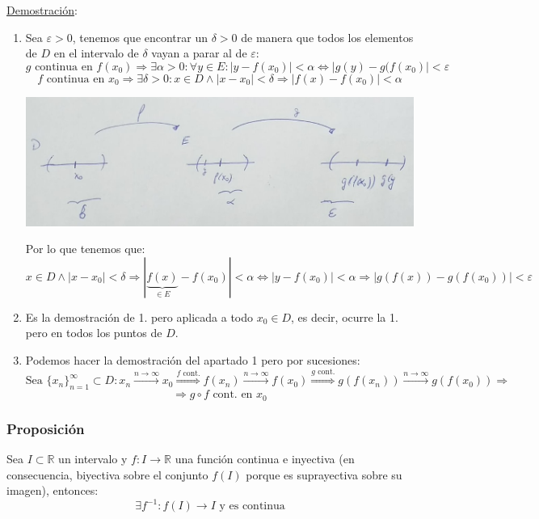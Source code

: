 \documentclass[10pt,a4paper,openright]{book}
\begin{document}
\underline{Demostración}:
\begin{enumerate}
\item Sea $\varepsilon>0$, tenemos que encontrar un $\delta>0$ de manera que todos los elementos de $D$ en el intervalo de $\delta $ vayan a parar al de $\varepsilon$:
$$g\mbox{ continua en }f(x_0)\Rightarrow \exists \alpha>0: \forall y\in E: |y-f(x_0)|<\alpha\Leftrightarrow |g(y)-g(f(x_0)|<\varepsilon$$
$$f\mbox{ continua en }x_0\Rightarrow \exists \delta>0: x\in D \wedge |x-x_0|<\delta\Rightarrow |f(x)-f(x_0)|<\alpha$$

\begin{center}
\includegraphics[scale=0.35]{continuidad de composicion}
\end{center}

Por lo que tenemos que:
$$x\in D \wedge |x-x_0|<\delta\Rightarrow |\underbrace{f(x)}_{\in E}-f(x_0)|<\alpha\Leftrightarrow |y-f(x_0)|<\alpha\Rightarrow |g(f(x))-g(f(x_0))|<\varepsilon$$

\item Es la demostración de 1. pero aplicada a todo $x_0\in D$, es decir, ocurre la 1. pero en todos los puntos de $D$. 

\item Podemos hacer la demostración del apartado 1 pero por sucesiones:
$$\mbox{Sea }\{x_n\}_{n=1}^\infty\subset D: x_n\xrightarrow{n\rightarrow\infty} x_0\stackrel{f \mbox{ cont.}}{\Rightarrow} f(x_n)\xrightarrow{n\rightarrow\infty} f(x_0)\stackrel{g \mbox{ cont.}}{\Rightarrow}g(f(x_n))\xrightarrow{n\rightarrow \infty} g(f(x_0))\Rightarrow$$
$$\Rightarrow g\circ f\mbox{ cont. en } x_0$$

\end{enumerate}

\subsubsection*{Proposición}
Sea $I\subset \mathbb R$ un intervalo y $f: I\longrightarrow \mathbb R$ una función continua e inyectiva (en consecuencia, biyectiva sobre el conjunto $f(I)$ porque es suprayectiva sobre su imagen), entonces:
$$\exists f^{-1}: f(I)\longrightarrow I\mbox{ y es continua}$$
\end{document}
